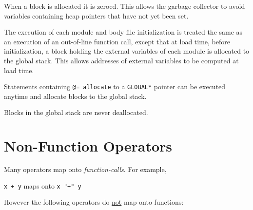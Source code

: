 \documentclass[12pt]{article}
\begin{document}
When a block is allocated it is zeroed.  This
allows the garbage collector to avoid variables containing
heap pointers that have not yet been set.

The execution of each module and body file initialization is
treated the same as an execution of an out-of-line function
call, except that at load time, before initialization,
a block holding the external variables of each module is
allocated to the global stack\label{GLOBAL-MEMORY}.  This allows addresses of
external variables to be computed at load time.

Statements containing {\tt @= allocate} to a {\tt *GLOBAL*} pointer
can be executed anytime
and allocate blocks to the global stack.

Blocks in the global stack are never deallocated.

\section{Non-Function Operators}

Many operators map onto {\em function-calls}.  For example, \\
\centerline{{\tt x + y} maps onto {\tt x "+" y}}

However the following operators do \underline{not} map onto functions:
\end{document}
